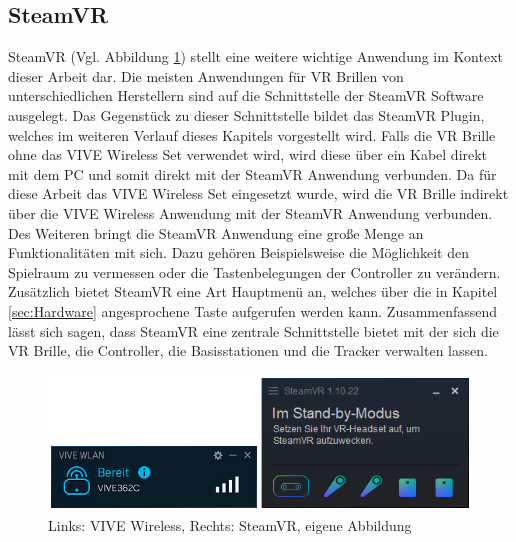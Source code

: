 \subsection{SteamVR}\label{sec:SteamVR}
SteamVR (Vgl. Abbildung \ref{fig:VIVEWirelessSteamVR}) stellt eine weitere wichtige Anwendung im Kontext dieser Arbeit dar. Die meisten Anwendungen für VR Brillen von unterschiedlichen Herstellern sind auf die Schnittstelle der SteamVR Software ausgelegt. Das Gegenstück zu dieser Schnittstelle bildet das SteamVR Plugin, welches im weiteren Verlauf dieses Kapitels vorgestellt wird. Falls die VR Brille ohne das VIVE Wireless Set verwendet wird, wird diese über ein Kabel direkt mit dem PC und somit direkt mit der SteamVR Anwendung verbunden. Da für diese Arbeit das VIVE Wireless Set eingesetzt wurde, wird die VR Brille indirekt über die VIVE Wireless Anwendung mit der SteamVR Anwendung verbunden. Des Weiteren bringt die SteamVR Anwendung eine große Menge an Funktionalitäten mit sich. Dazu gehören Beispielsweise die Möglichkeit den Spielraum zu vermessen oder die Tastenbelegungen der Controller zu verändern. Zusätzlich bietet SteamVR eine Art Hauptmenü an, welches über die in Kapitel \ref{sec:Hardware} angesprochene Taste aufgerufen werden kann.
\newline
Zusammenfassend lässt sich sagen, dass SteamVR eine zentrale Schnittstelle bietet mit der sich die VR Brille, die Controller, die Basisstationen und die Tracker verwalten lassen.
\begin{figure}[h]
	\centering
	\includegraphics[width=0.8\linewidth]{Bilder/A33_VIVESteam}
	\caption{Links: VIVE Wireless, Rechts: SteamVR, eigene Abbildung}
	\label{fig:VIVEWirelessSteamVR}
\end{figure}

